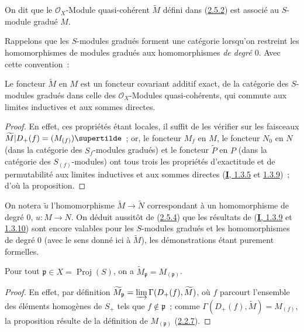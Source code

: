 \begin{definition}[2.5.3]
\label{II.2.5.3-fr}
On dit que le $\mathcal{O}_X$-Module quasi-cohérent $\widetilde{M}$ défini
dans (\hyperref[II.2.5.2-fr]{2.5.2}) est associé au $S$-module
gradué $M$.
\end{definition}

Rappelons que les $S$-modules gradués forment une catégorie lorsqu'on
restreint les homomorphismes de modules gradués aux homomorphismes
\emph{de degré $0$}. Avec cette convention~:

\begin{proposition}[2.5.4]
\label{II.2.5.4-fr}
Le foncteur $\widetilde{M}$ en $M$ est un foncteur covariant additif exact,
de la catégorie des $S$-modules gradués dans celle des
$\mathcal{O}_X$-Modules quasi-cohérents, qui commute aux limites
inductives et aux sommes directes.
\end{proposition}

\begin{proof}
En effet, ces propriétés étant locales, il suffit de les vérifier sur les
faisceaux
$\widetilde{M}|D_+(f)=(M_{(f)})\supertilde$~; or, le foncteur
$M_f$ en $M$, le foncteur $N_0$ en $N$ (dans la catégorie des
$S_f$-modules gradués) et le foncteur $\widetilde{P}$ en $P$ (dans la
catégorie des $S_{(f)}$-modules) ont tous trois les propriétés d'exactitude
et de permutabilité aux limites inductives et aux sommes directes
(\hyperref[I.1.3.5-fr]{\textbf{I}, 1.3.5} et
\hyperref[I.1.3.9-fr]{1.3.9})~; d'où la proposition.
\end{proof}

On notera $\widetilde{u}$ l'homomorphisme
$\widetilde{M}\to\widetilde{N}$ correspondant à un homomorphisme de degré
$0$, $u:M\to N$. On déduit aussitôt de
(\hyperref[II.2.5.4-fr]{2.5.4}) que les résultats de
(\hyperref[I.1.3.9-fr]{\textbf{I}, 1.3.9} et
\hyperref[I.1.3.10-fr]{1.3.10}) sont encore valables pour les
$S$-modules gradués et les homomorphismes de degré $0$ (avec le sens donné
ici à $\widetilde{M}$), les démonstrations étant purement formelles.

\begin{proposition}[2.5.5]
\label{II.2.5.5-fr}
Pour tout $\mathfrak{p}\in X=\operatorname{Proj}(S)$, on a
$\widetilde{M}_{\mathfrak{p}}=M_{(\mathfrak{p})}$.
\end{proposition}

\begin{proof}
En effet, par définition
$\widetilde{M}_{\mathfrak{p}}=
\varinjlim\Gamma(D_+(f),\widetilde{M})$, où $f$ parcourt l'ensemble des
éléments homogènes de $S_+$ tels que $f\notin\mathfrak{p}$~; comme
$\Gamma(D_+(f),\widetilde{M})=M_{(f)}$, la proposition résulte de la
définition de $M_{(\mathfrak{p})}$
(\hyperref[II.2.2.7-fr]{2.2.7}).
\end{proof}

